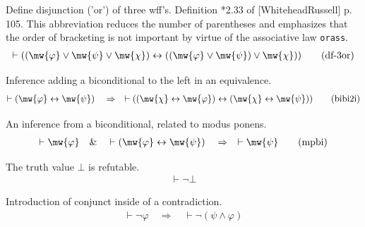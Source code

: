 \begin{metadefinition} Define disjunction ('or') of three wff's.
Definition *2.33 of
     [WhiteheadRussell] p. 105.  This abbreviation reduces the number of
     parentheses and emphasizes that the order of bracketing is not important
     by virtue of the associative law {\tt orass}.  
\begin{align}
\vdash ( ( \mw{\varphi} \vee \mw{\psi} \vee \mw{\chi} ) \leftrightarrow ( (
    \mw{\varphi} \vee \mw{\psi} ) \vee \mw{\chi} )
    )\label{eq:df-3or}\tag{df-3or}
\end{align}
\end{metadefinition}


\begin{lemma} Inference adding a biconditional to the left
in an equivalence.
\begin{align}
\vdash ( \mw{\varphi} \leftrightarrow \mw{\psi} )\quad\Rightarrow\quad \vdash (
    ( \mw{\chi} \leftrightarrow \mw{\varphi} ) \leftrightarrow ( \mw{\chi}
    \leftrightarrow \mw{\psi} ) )\label{eq:bibi2i}\tag{bibi2i}
\end{align}
\end{lemma}


\begin{lemma} An inference from a biconditional, related to
modus ponens.
\begin{align}
\vdash \mw{\varphi}\quad\&\quad \vdash ( \mw{\varphi} \leftrightarrow \mw{\psi}
    )\quad\Rightarrow\quad \vdash \mw{\psi}\label{eq:mpbi}\tag{mpbi}
\end{align}
\end{lemma}


\begin{lemma} The truth value $\bot$ is refutable. 
\begin{align}
\vdash \lnot \bot\label{eq:fal}\tag{fal}
\end{align}
\end{lemma}


\begin{lemma} Introduction of conjunct inside of a
contradiction.  
\begin{align}
\vdash \lnot \varphi\quad\Rightarrow\quad \vdash \lnot ( \psi \wedge \varphi
    )\label{eq:intnan}\tag{intnan}
\end{align}
\end{lemma}


